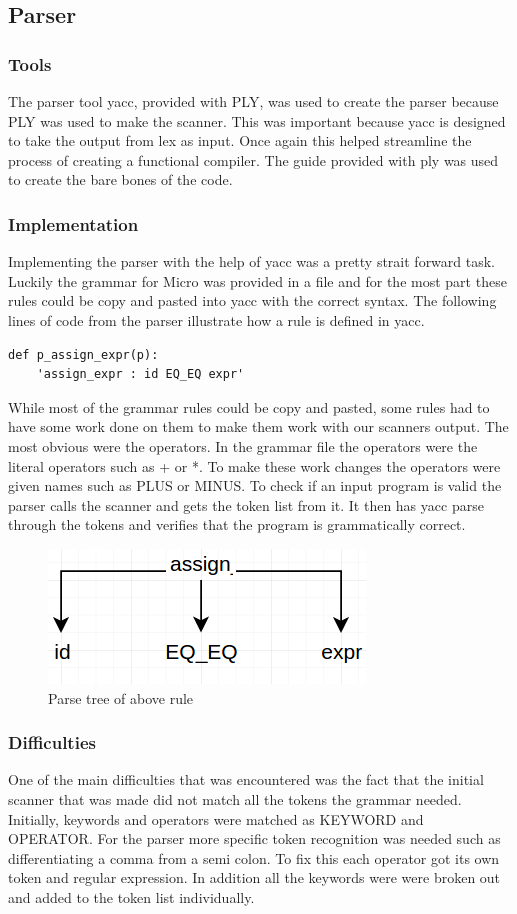 \documentclass[12pt, oneside]{article}   	%
\begin{document}
		
		
\subsection{Parser}
\subsubsection{Tools}
The parser tool yacc, provided with PLY, was used to create the parser because PLY was used to make the scanner. This was important because yacc is designed to take the output from lex as input. Once again this helped streamline the process of creating a functional compiler.
The guide provided with ply was used to create the bare bones of the code.

\subsubsection{Implementation}
Implementing the parser with the help of yacc was a pretty strait forward task. Luckily the grammar for Micro was provided in a file and  for the most part these rules
could be copy and pasted into yacc with the correct syntax. The following lines of code from the parser illustrate how a rule is defined in yacc.
\begin{lstlisting}
def p_assign_expr(p):
    'assign_expr : id EQ_EQ expr'
\end{lstlisting}

While most of the grammar rules could be copy and pasted, some rules had to have some work done on them
to make them work with our scanners output. The most obvious were the operators. In the grammar file the operators were the literal operators such as + or *. To make these work changes the operators were given names such as PLUS or
MINUS. To check if an input program is valid the parser calls the scanner and gets the token list from it. It then
has yacc parse through the tokens and verifies that the program is grammatically correct.
\begin{figure}[h!]
	\centerline{\includegraphics[width=.4\linewidth]{pics/parse_tree}}
	\caption{Parse tree of above rule}
\end{figure}

\subsubsection{Difficulties}
One of the main difficulties that was encountered was the fact that the initial scanner that was
made did not match all the tokens the grammar needed. Initially, keywords and operators were matched as
KEYWORD and OPERATOR. For the parser more specific token recognition was needed such
as differentiating a comma from a semi colon. To fix this each operator got its own token and regular expression. In addition all the keywords were were broken out and added to the token list individually.
\end{document}

